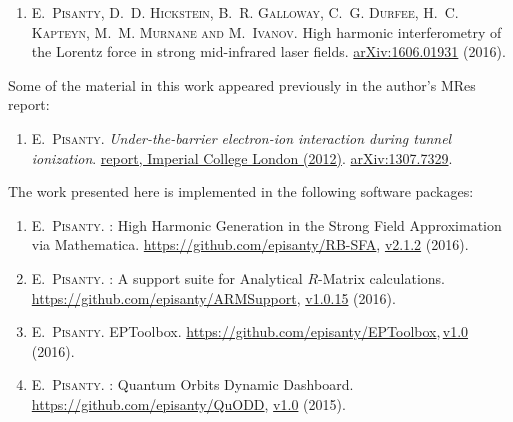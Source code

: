 \begin{enumerate}
\item[{\hypersetup{citecolor=black}\cite{Pisanty_lorentz_2016}}]
\textsc{E.~Pisanty, D.~D. Hickstein, B.~R. Galloway, C.~G. Durfee, H.~C. Kap\-teyn, M.~M. Murnane and M.~Ivanov}.
\newblock High harmonic interferometry of the {L}orentz force in strong
  mid-infrared laser fields.
\newblock \href{http://arxiv.org/abs/1606.01931}{arXiv:1606.01931} (2016).
\end{enumerate}

\noindent
Some of the material in this work appeared previously in the author's MRes report:
\begin{enumerate}
\item[{\hypersetup{citecolor=black}\cite{MResReport}}]
\textsc{E.~Pisanty}.
\newblock \emph{Under-the-barrier electron-ion interaction during tunnel
  ionization}. 
  \href{http://www3.imperial.ac.uk/controlledquantumdynamics/people/students/cohortthree/emiliopisantyalatorre }{
 report, Imperial College London (2012)}.
\newblock \href{http://arxiv.org/abs/1307.7329}{arXiv:1307.7329}.
\end{enumerate}


\noindent
The work presented here is implemented in the following software packages:

\begin{enumerate}
\item[{\hypersetup{citecolor=black}\cite{RB-SFA}}]
\textsc{E.~Pisanty}.
: {H}igh {H}armonic {G}eneration in the {S}trong {F}ield
  {A}pproximation via {M}athematica.
\newblock \url{https://github.com/episanty/RB-SFA}, \href{http://dx.doi.org/10.5281/zenodo.164626}{v2.1.2} (2016).

\item[{\hypersetup{citecolor=black}\cite{ARMSupport}}]
\textsc{E.~Pisanty}.
: {A} support suite for {A}nalytical {$R$}-{M}atrix
  calculations.
\newblock \url{https://github.com/episanty/ARMSupport}, \href{https://doi.org/10.5281/zenodo.164629}{v1.0.15} (2016).

\item[{\hypersetup{citecolor=black}\cite{EPToolbox}}]
\textsc{E.~Pisanty}. EPToolbox. \url{https://github.com/episanty/EPToolbox},\,\href{https://doi.org/10.5281/zenodo.164630}{v1.0} (2016).

\item[{\hypersetup{citecolor=black}\cite{QuODD}}]
\textsc{E.~Pisanty}.
: Quantum Orbits Dynamic Dashboard.
\newblock \url{https://github.com/episanty/QuODD}, \href{https://doi.org/10.5281/zenodo.164633}{v1.0} (2015).
\end{enumerate}

